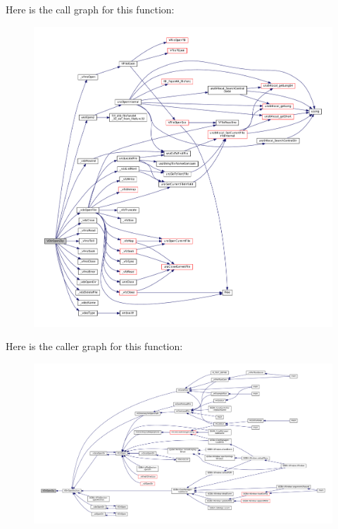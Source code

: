 Here is the call graph for this function\+:
\nopagebreak
\begin{figure}[H]
\begin{center}
\leavevmode
\includegraphics[width=350pt]{vfs-zip_8c_a0107bc6e3321e3c0ebf36b9a27cfa452_cgraph}
\end{center}
\end{figure}
Here is the caller graph for this function\+:
\nopagebreak
\begin{figure}[H]
\begin{center}
\leavevmode
\includegraphics[width=350pt]{vfs-zip_8c_a0107bc6e3321e3c0ebf36b9a27cfa452_icgraph}
\end{center}
\end{figure}
